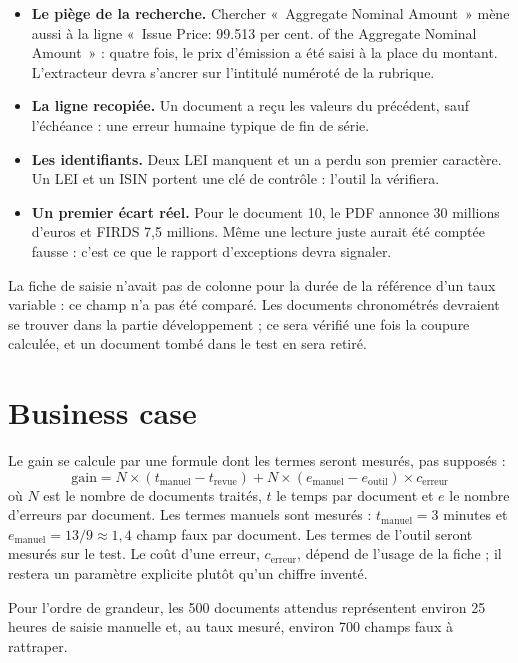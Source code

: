 \documentclass[11pt,a4paper]{article}
\begin{document}
\begin{itemize}
  \item \textbf{Le piège de la recherche.} Chercher «~Aggregate Nominal Amount~» mène aussi à la ligne «~\foreignlanguage{english}{Issue Price: 99.513 per cent. of the Aggregate Nominal Amount}~» : quatre fois, le prix d'émission a été saisi à la place du montant. L'extracteur devra s'ancrer sur l'intitulé numéroté de la rubrique.
  \item \textbf{La ligne recopiée.} Un document a reçu les valeurs du précédent, sauf l'échéance : une erreur humaine typique de fin de série.
  \item \textbf{Les identifiants.} Deux LEI manquent et un a perdu son premier caractère. Un LEI et un ISIN portent une clé de contrôle : l'outil la vérifiera.
  \item \textbf{Un premier écart réel.} Pour le document 10, le PDF annonce 30 millions d'euros et FIRDS 7,5 millions. Même une lecture juste aurait été comptée fausse : c'est ce que le rapport d'exceptions devra signaler.
\end{itemize}

La fiche de saisie n'avait pas de colonne pour la durée de la référence d'un taux variable : ce champ n'a pas été comparé. Les documents chronométrés devraient se trouver dans la partie développement ; ce sera vérifié une fois la coupure calculée, et un document tombé dans le test en sera retiré.

\section{Business case}

Le gain se calcule par une formule dont les termes seront mesurés, pas supposés :
\[
\text{gain} = N \times (t_{\text{manuel}} - t_{\text{revue}}) + N \times (e_{\text{manuel}} - e_{\text{outil}}) \times c_{\text{erreur}}
\]
où $N$ est le nombre de documents traités, $t$ le temps par document et $e$ le nombre d'erreurs par document. Les termes manuels sont mesurés : $t_{\text{manuel}} = 3$ minutes et $e_{\text{manuel}} = 13/9 \approx 1{,}4$ champ faux par document. Les termes de l'outil seront mesurés sur le test. Le coût d'une erreur, $c_{\text{erreur}}$, dépend de l'usage de la fiche ; il restera un paramètre explicite plutôt qu'un chiffre inventé.

Pour l'ordre de grandeur, les 500 documents attendus représentent environ 25 heures de saisie manuelle et, au taux mesuré, environ 700 champs faux à rattraper.
\end{document}
